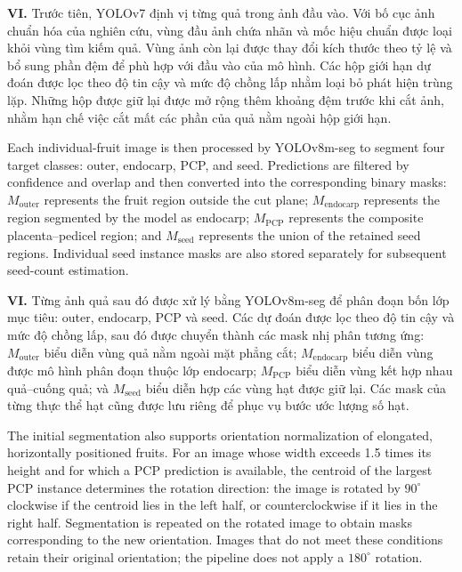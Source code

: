 \documentclass[final,1p,11pt,longtitle]{elsarticle}
\newenvironment{viet}{\par\smallskip\begingroup\color{viColor}\noindent\textbf{VI. }\ignorespaces}{\par\endgroup\smallskip}
\begin{document}
\begin{viet}
Trước tiên, YOLOv7 định vị từng quả trong ảnh đầu vào. Với bố cục ảnh chuẩn hóa của nghiên cứu, vùng đầu ảnh chứa nhãn và mốc hiệu chuẩn được loại khỏi vùng tìm kiếm quả. Vùng ảnh còn lại được thay đổi kích thước theo tỷ lệ và bổ sung phần đệm để phù hợp với đầu vào của mô hình. Các hộp giới hạn dự đoán được lọc theo độ tin cậy và mức độ chồng lấp nhằm loại bỏ phát hiện trùng lặp. Những hộp được giữ lại được mở rộng thêm khoảng đệm trước khi cắt ảnh, nhằm hạn chế việc cắt mất các phần của quả nằm ngoài hộp giới hạn.
\end{viet}

Each individual-fruit image is then processed by YOLOv8m-seg to segment four target classes: outer, endocarp, PCP, and seed. Predictions are filtered by confidence and overlap and then converted into the corresponding binary masks: $M_{\mathrm{outer}}$ represents the fruit region outside the cut plane; $M_{\mathrm{endocarp}}$ represents the region segmented by the model as endocarp; $M_{\mathrm{PCP}}$ represents the composite placenta--pedicel region; and $M_{\mathrm{seed}}$ represents the union of the retained seed regions. Individual seed instance masks are also stored separately for subsequent seed-count estimation.

\begin{viet}
Từng ảnh quả sau đó được xử lý bằng YOLOv8m-seg để phân đoạn bốn lớp mục tiêu: outer, endocarp, PCP và seed. Các dự đoán được lọc theo độ tin cậy và mức độ chồng lấp, sau đó được chuyển thành các mask nhị phân tương ứng: $M_{\mathrm{outer}}$ biểu diễn vùng quả nằm ngoài mặt phẳng cắt; $M_{\mathrm{endocarp}}$ biểu diễn vùng được mô hình phân đoạn thuộc lớp endocarp; $M_{\mathrm{PCP}}$ biểu diễn vùng kết hợp nhau quả--cuống quả; và $M_{\mathrm{seed}}$ biểu diễn hợp các vùng hạt được giữ lại. Các mask của từng thực thể hạt cũng được lưu riêng để phục vụ bước ước lượng số hạt.
\end{viet}

The initial segmentation also supports orientation normalization of elongated, horizontally positioned fruits. For an image whose width exceeds 1.5 times its height and for which a PCP prediction is available, the centroid of the largest PCP instance determines the rotation direction: the image is rotated by $90^{\circ}$ clockwise if the centroid lies in the left half, or counterclockwise if it lies in the right half. Segmentation is repeated on the rotated image to obtain masks corresponding to the new orientation. Images that do not meet these conditions retain their original orientation; the pipeline does not apply a $180^{\circ}$ rotation.
\end{document}
